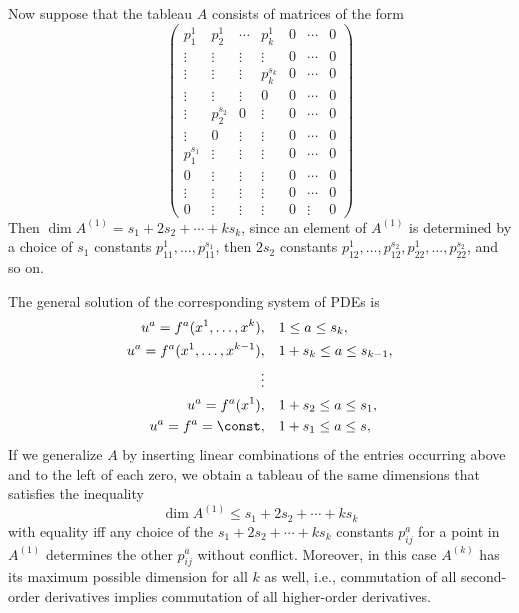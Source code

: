 \begin{example}
    Now suppose that the tableau $A$ consists of matrices of the form 
    \[
        \begin{pmatrix}
            p^1_1  &  p_2^1 & \cdots & p^1_k & 0&\cdots &0\\
            \vdots & \vdots & \vdots & \vdots & 0 & \cdots & 0\\
            \vdots & \vdots & \vdots & p^{s_k}_k & 0 &\cdots & 0\\
            \vdots & \vdots & \vdots & 0 & 0 & \cdots &0\\
            \vdots & p_2^{s_2}& 0    & \vdots & 0 &\cdots & 0\\
            \vdots & 0 & \vdots      & \vdots & 0 &\cdots & 0\\
            p_1^{s_1}& \vdots &\vdots &\vdots &0 &\cdots &0\\
            0& \vdots & \vdots & \vdots  & 0& \cdots & 0\\
            \vdots & \vdots &\vdots &\vdots & 0 &\cdots &0\\
            0& \vdots & \vdots &\vdots & 0 &\vdots & 0
        \end{pmatrix}\label{eq 5.16 Ivey}
    \]
    Then $\dim A^{(1)}=s_1+2s_2+\cdots +ks_k$, since an element of $A^{(1)}$ is determined by a choice of $s_1$ constants $p^1_{11},\ldots,p^{s_1}_{11}$, then $2s_2$ constants $p^1_{12},\ldots,p^{s_2}_{12}, p^1_{22},\ldots,p^{s_2}_{22}$, and so on.

    The general solution of the corresponding system of PDEs is 
    \begin{align*}
        u^a=f^a(x^1,\ldots,x^k),&\quad 1\leq a\leq s_k,\\
        u^a=f^a(x^1,\ldots,x^{k-1}),&\quad 1+s_k\leq a\leq s_{k-1},\\
        \vdots &\\
        u^a=f^a(x^1),&\quad 1+s_2\leq a\leq s_1,\\
        u^a=f^a=\const,&\quad 1+s_1\leq a\leq s,
    \end{align*}
    If we generalize $A$ by inserting  linear combinations of the entries occurring above and to the left of each zero, we obtain a tableau of the same dimensions that satisfies the inequality
    \[\dim A^{(1)}\leq s_1+2s_2+\cdots +ks_k\]
    with equality iff any choice of the $s_1+2s_2+\cdots +ks_k$ constants $p^a_{ij}$ for a point in $A^{(1)}$ determines the other $p^a_{ij}$ without conflict. Moreover, in this case $A^{(k)}$ has its maximum possible dimension for all $k$ as well, i.e., commutation of all second-order derivatives implies commutation of all higher-order derivatives.
\end{example}


